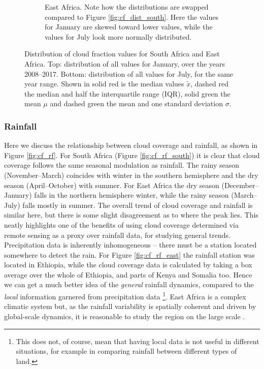 \begin{figure}
\begin{subfigure}{0.45\textwidth}
    \caption{East Africa. Note how the distributions are swapped
      compared to Figure \ref{fig:cf_dist_south}. Here the values for
      January are skewed toward lower values, while the values for
      July look more normally distributed.}
    \label{fig:cf_dist_east}
  \end{subfigure}
  \caption{Distribution of cloud fraction values for South Africa and
    East Africa. Top: distribution of all values for January, over the
    years 2008--2017. Bottom: distribution of all values for July, for
    the same year range. Shown in solid red is the median values
    $\tilde{x}$, dashed red the median and half the interquartile
    range (IQR), solid green the mean $\mu$ and dashed green the mean
    and one standard deviation $\sigma$.}
  \label{fig:cf_dist}
\end{figure}

\subsubsection{Rainfall}
\label{sec:disc:rain}
Here we discuss the relationship between cloud coverage and rainfall,
as shown in Figure \ref{fig:cf_rf}. For South Africa (Figure
\ref{fig:cf_rf_south}) it is clear that cloud coverage follows the
same seasonal modulation as rainfall. The rainy season
(November--March) coincides with winter in the southern hemisphere and
the dry season (April--October) with summer. For East Africa the dry
season (December--January) falls in the northern hemisphere winter,
while the rainy season (March--July) falls mostly in summer. The
overall trend of cloud coverage and rainfall is similar here, but
there is some slight disagreement as to where the peak lies. This
neatly highlights one of the benefits of using cloud coverage
determined via remote sensing as a proxy over rainfall data, for
studying general trends. Precipitation data is inherently
inhomogeneous -- there must be a station located somewhere to detect
the rain. For Figure \ref{fig:cf_rf_east} the rainfall station was
located in Ethiopia, while the cloud coverage data is calculated by
taking a box average over the whole of Ethiopia, and parts of Kenya
and Somalia too. Hence we can get a much better idea of the
\emph{general} rainfall dynamics, compared to the \emph{local}
information garnered from precipitation data \footnote{This does not,
  of course, mean that having local data is not useful in different
  situations, for example in comparing rainfall between different
  types of land.}. East Africa is a complex climatic system but, as
the rainfall variability is spatially coherent and driven by
global-scale dynamics, it is reasonable to study the region on the
large scale \citep{nicholson1996b}.
  
